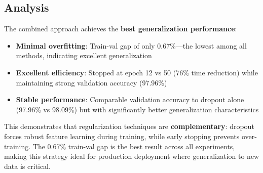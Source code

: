 \subsection{Analysis}

The combined approach achieves the \textbf{best generalization performance}:
\begin{itemize}
    \item \textbf{Minimal overfitting}: Train-val gap of only 0.67\%—the lowest among all methods, indicating excellent generalization
    \item \textbf{Excellent efficiency}: Stopped at epoch 12 vs 50 (76\% time reduction) while maintaining strong validation accuracy (97.96\%)
    \item \textbf{Stable performance}: Comparable validation accuracy to dropout alone (97.96\% vs 98.09\%) but with significantly better generalization characteristics
\end{itemize}

This demonstrates that regularization techniques are \textbf{complementary}: dropout forces robust feature learning during training, while early stopping prevents over-training. The 0.67\% train-val gap is the best result across all experiments, making this strategy ideal for production deployment where generalization to new data is critical.